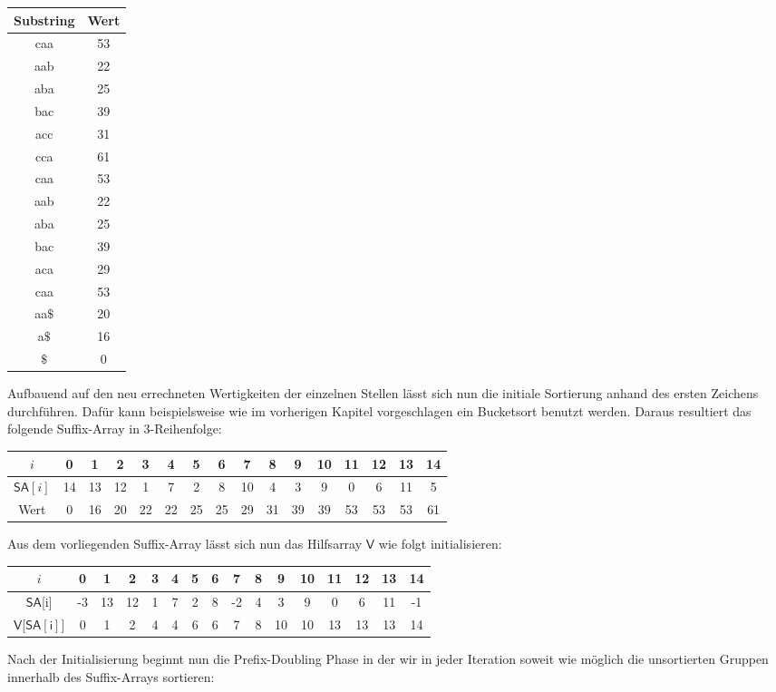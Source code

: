 \begin{center}
\begin{tabular}{c | c}
Substring & Wert \\
\hline
caa & 53 \\
aab & 22 \\
aba & 25 \\
bac & 39 \\
acc & 31 \\
cca & 61 \\
caa & 53 \\
aab & 22 \\
aba & 25 \\
bac & 39 \\
aca & 29 \\
caa & 53 \\
aa$\$$ & 20 \\
a$\$$ & 16 \\
$\$$ & 0 
\end{tabular}
\end{center}

Aufbauend auf den neu errechneten Wertigkeiten der einzelnen Stellen lässt sich nun die initiale Sortierung anhand des ersten Zeichens durchführen. Dafür kann beispielsweise wie im vorherigen Kapitel vorgeschlagen ein Bucketsort benutzt werden. Daraus resultiert das folgende Suffix-Array in 3-Reihenfolge:\\
\begin{center}
\begin{tabular}{| c | c | c | c | c | c | c | c | c | c | c | c | c | c | c | c |}
\hline
$i$ & 0 & 1 &2 &3 &4 &5 &6 &7 &8 &9 &10 &11 &12 &13 &14 \\
\hline
$\mathsf{SA}[i]$ & 14 & 13 &12 &1 &7 & 2 &8 &10 &4 &3 &9 &0 &6 &11 &5 \\
\hline
Wert & 0 & 16 &20 &22 &22 &25 &25 &29 &31 &39 &39 &53 &53 &53 &61 \\
\hline
\end{tabular}
\end{center}
Aus dem vorliegenden Suffix-Array lässt sich nun das Hilfsarray $\mathsf{V}$ wie folgt initialisieren:\\
\begin{center}
\begin{tabular}{| c | c | c | c | c | c | c | c | c | c | c | c | c | c | c | c |}
\hline
$i$ & 0 & 1 &2 &3 &4 &5 &6 &7 &8 &9 &10 &11 &12 &13 &14 \\
\hline
$\mathsf{SA}$[i] & -3 & 13 &12 &1 &7 & 2 &8 &-2 &4 &3 &9 &0 &6 &11 &-1 \\

$\mathsf{V}$[$\mathsf{SA[i]}$] & 0 & 1 & 2 & 4 & 4 & 6 & 6 & 7 & 8 & 10 & 10 & 13 & 13 & 13 & 14 \\
\hline
\end{tabular}
\end{center}
Nach der Initialisierung beginnt nun die Prefix-Doubling Phase in der wir in jeder Iteration soweit wie möglich die unsortierten Gruppen innerhalb des Suffix-Arrays sortieren:

